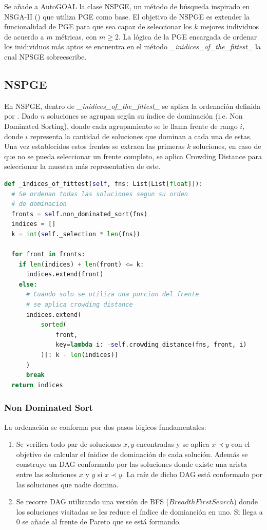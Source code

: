 Se a\~nade a AutoGOAL la clase NSPGE, un m\'etodo de b\'usqueda inspirado en NSGA-II (\cite{deb2002fast}) que utiliza PGE como base. El objetivo de NSPGE es extender la funcionalidad de PGE para que sea capaz de seleccionar los $k$ mejores individuos de acuerdo a $m$ m\'etricas, con $m \ge 2$. La l\'ogica de la PGE encargada de ordenar los inidividuos m\'as aptos se encuentra en el m\'etodo \textit{\_inidices\_of\_the\_fittest\_} la cual NPSGE sobreescribe.

\subsection{NSPGE}

En NSPGE, dentro de \textit{\_inidices\_of\_the\_fittest\_} se aplica la ordenaci\'on definida por \cite{deb2002fast}. Dado $n$ soluciones se  agrupan seg\'un su \'indice de dominaci\'on (i.e. Non Dominated Sorting), donde cada agrupamiento se le llama frente de rango $i$, donde $i$ representa la cantidad de soluciones que dominan a cada una de estas. Una vez establecidos estos frentes se extraen las primeras $k$ soluciones, en caso de que no se pueda seleccionar un frente completo, se aplica Crowding Distance para seleccionar la muestra m\'as representativa de este.


\begin{lstlisting}[language=Python]
def _indices_of_fittest(self, fns: List[List[float]]):
  # Se ordenan todas las soluciones segun su orden
  # de dominacion
  fronts = self.non_dominated_sort(fns)
  indices = []
  k = int(self._selection * len(fns))

  for front in fronts:
    if len(indices) + len(front) <= k:
      indices.extend(front)
    else:
      # Cuando solo se utiliza una porcion del frente
      # se aplica crowding distance
      indices.extend(
          sorted(
              front,
              key=lambda i: -self.crowding_distance(fns, front, i)
          )[: k - len(indices)]
      )
      break
  return indices
\end{lstlisting}

\subsubsection{Non Dominated Sort}
La ordenaci\'on se conforma por dos pasos l\'ogicos fundamentales:
\begin{enumerate}
    \item Se verifica todo par de soluciones $x, y$ encontradas y se aplica $x \prec y$ con el objetivo de calcular el \'inidice de dominaci\'on de cada soluci\'on. Adem\'as se construye un DAG conformado por las soluciones donde existe una arista entre las soluciones $x$ y $y$ si $x \prec y$. La ra\'iz de dicho DAG est\'a conformado por las soluciones que nadie domina.
    \item Se recorre DAG utilizando una versi\'on de BFS ($Breadth First Search$) donde los soluciones visitadas se les reduce el \'indice de domianci\'on en uno. Si llega a 0 se a\~nade al frente de Pareto que se est\'a formando.
\end{enumerate}

